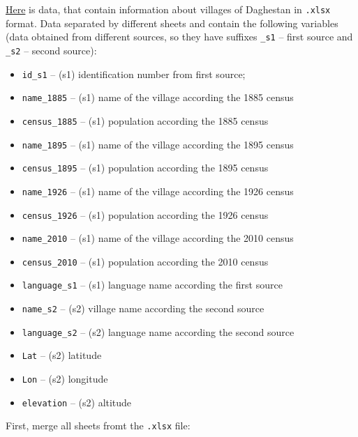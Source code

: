 \documentclass[
]{book}
\makeatletter
\providecommand{\tightlist}{%
  \setlength{\itemsep}{0pt}\setlength{\parskip}{0pt}}
\newenvironment{kframe}{%
\medskip{}
\setlength{\fboxsep}{.8em}
 \def\at@end@of@kframe{}%
 \ifinner\ifhmode%
  \def\at@end@of@kframe{\end{minipage}}%
  \begin{minipage}{\columnwidth}%
 \fi\fi%
 \def\FrameCommand##1{\hskip\@totalleftmargin \hskip-\fboxsep
 \colorbox{shadecolor}{##1}\hskip-\fboxsep
     \hskip-\linewidth \hskip-\@totalleftmargin \hskip\columnwidth}%
 \MakeFramed {\advance\hsize-\width
   \@totalleftmargin\z@ \linewidth\hsize
   \@setminipage}}%
 {\par\unskip\endMakeFramed%
 \at@end@of@kframe}
\newenvironment{rmdblock}[1]
  {
  \begin{itemize}
  \renewcommand{\labelitemi}{
    \raisebox{-.7\height}[0pt][0pt]{
      {\setkeys{Gin}{width=3em,keepaspectratio}\texttt{[image: images/\#1]}}
    }
  }
  \setlength{\fboxsep}{1em}
  \begin{kframe}
  \item
  }
  {
  \end{kframe}
  \end{itemize}
  }
\newenvironment{rmdtask}
  {\begin{rmdblock}{task}}
  {\end{rmdblock}}
\makeatother
\begin{document}
\begin{rmdtask}
\href{https://github.com/agricolamz/2020.02_Naumburg_R/raw/master/data/daghestan_census.xlsx}{Here}
is data, that contain information about villages of Daghestan in
\texttt{.xlsx} format. Data separated by different sheets and contain
the following variables (data obtained from different sources, so they
have suffixes \texttt{\_s1} -- first source and \texttt{\_s2} -- second
source):

\begin{itemize}
\tightlist
\item
  \texttt{id\_s1} -- (s1) identification number from first source;
\item
  \texttt{name\_1885} -- (s1) name of the village according the 1885
  census
\item
  \texttt{census\_1885} -- (s1) population according the 1885 census
\item
  \texttt{name\_1895} -- (s1) name of the village according the 1895
  census
\item
  \texttt{census\_1895} -- (s1) population according the 1895 census
\item
  \texttt{name\_1926} -- (s1) name of the village according the 1926
  census
\item
  \texttt{census\_1926} -- (s1) population according the 1926 census
\item
  \texttt{name\_2010} -- (s1) name of the village according the 2010
  census
\item
  \texttt{census\_2010} -- (s1) population according the 2010 census
\item
  \texttt{language\_s1} -- (s1) language name according the first source
\item
  \texttt{name\_s2} -- (s2) village name according the second source
\item
  \texttt{language\_s2} -- (s2) language name according the second
  source
\item
  \texttt{Lat} -- (s2) latitude
\item
  \texttt{Lon} -- (s2) longitude
\item
  \texttt{elevation} -- (s2) altitude
\end{itemize}

First, merge all sheets fromt the \texttt{.xlsx} file:
\end{rmdtask}
\end{document}
